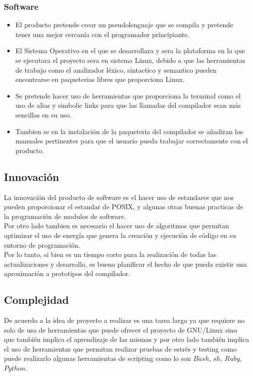 \documentclass[10pt,executivepaper]{article}
\begin{document}
\subsubsection{Software}
\begin{itemize}
  \item El producto pretende crear un pseudolenguaje que se compila y pretende tener una mejor cercanía con el programador principiante.
  \item El Sistema Operativo en el que se desarrollara y sera la plataforma en la que se ejecutara el proyecto sera en sistema Linux, debido a que las herramientas de trabajo como el analizador léxico, sintactico y semantico pueden encontrarse en paqueterias libres que proporciona Linux.
  \item Se pretende hacer uso de herramientas que proporciona la terminal como el uso de alias y simbolic links para que las llamadas del compilador sean más sencillas en su uso.
  \item Tambien se en la instalación de la paqueteria del compilador se añadiran los manuales pertinentes para que el usuario pueda trabajar correctamente con el producto.
\end{itemize}

\subsection{Innovación}
La innovación del producto de software es el hacer uso de estandares que nos pueden proporcionar el estandar de POSIX, y algunas otras buenas practicas de la programación de modulos de software.\\
Por otro lado tambien es necesario el hacer uso de algoritmos que permitan optimizar el uso de energía que genera la creación y ejecución de código en su entorno de programación.\\
Por lo tanto, si bien es un tiempo corto para la realización de todas las actualizaciones y desarrollo, es bueno planificar el hecho de que pueda existir una aproximación a prototipos del compilador.
\subsection{Complejidad}
De acuerdo a la idea de proyecto a realizar es una tarea larga ya que requiere no solo de uso de herramientas que puede ofrecer el proyecto de GNU/Linux sino que también implica el aprendizaje de las mismas y por otro lado también implica el uso de herramientas que permitan realizar pruebas de estrés y testing como puede realizarlo algunas herramientas de scripting como lo son $Bash$, $sh$, $Ruby$, $Python$.
\end{document}
